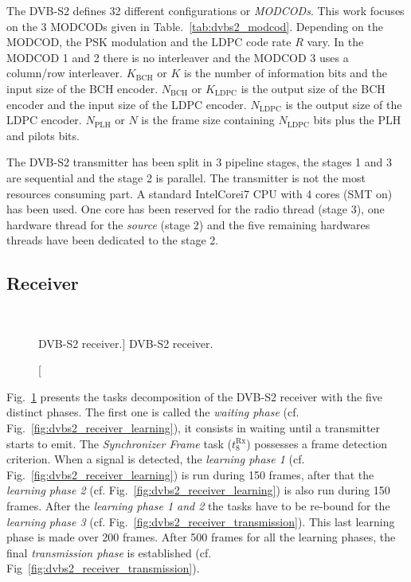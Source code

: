 The DVB-S2 defines 32 different configurations or \emph{MODCODs}. This work
focuses on the 3 MODCODs given in Table.~\ref{tab:dvbs2_modcod}. Depending on
the MODCOD, the PSK modulation and the LDPC code rate $R$ vary. In the MODCOD 1
and 2 there is no interleaver and the MODCOD 3 uses a column/row interleaver.
$K_\text{BCH}$ or $K$ is the number of information bits and the input size of
the BCH encoder. $N_\text{BCH}$ or $K_\text{LDPC}$ is the output size of the
BCH encoder and the input size of the LDPC encoder. $N_\text{LDPC}$ is the
output size of the LDPC encoder. $N_\text{PLH}$ or $N$ is the frame size
containing $N_\text{LDPC}$ bits plus the PLH and pilots bits.

The DVB-S2 transmitter has been split in 3 pipeline stages, the stages 1 and 3
are sequential and the stage 2 is parallel. The transmitter is not the most
resources consuming part. A standard Intel\R Core\TM i7 CPU with 4 cores (SMT
on) has been used. One core has been reserved for the radio thread (stage 3),
one hardware thread for the \emph{source} (stage 2) and the five
remaining hardwares threads have been dedicated to the stage 2.

\subsection{Receiver}

\begin{figure}[htp]
  \centering
  \\
  \caption
    [DVB-S2 receiver.]
    {DVB-S2 receiver.}
  \label{fig:dvbs2_receiver}
\end{figure}

Fig.~\ref{fig:dvbs2_receiver} presents the tasks decomposition of the DVB-S2
receiver with the five distinct phases. The first one is called the
\emph{waiting phase} (cf. Fig.~\ref{fig:dvbs2_receiver_learning}), it consists
in waiting until a transmitter starts to emit. The \emph{Synchronizer
Frame} task ($t^\text{Rx}_8$) possesses a frame detection criterion. When a
signal is detected, the \emph{learning phase 1} (cf.
Fig.~\ref{fig:dvbs2_receiver_learning}) is run during 150 frames, after that the
\emph{learning phase 2} (cf. Fig.~\ref{fig:dvbs2_receiver_learning}) is also run
during 150 frames. After the \emph{learning phase 1 and 2} the tasks have to be
re-bound for the \emph{learning phase 3}
(cf. Fig.~\ref{fig:dvbs2_receiver_transmission}). This last learning phase is
made over 200 frames. After 500 frames for all the learning phases, the final
\emph{transmission phase} is established (cf.
Fig~\ref{fig:dvbs2_receiver_transmission}).

